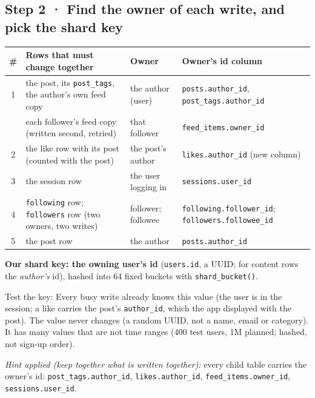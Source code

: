 \subsection*{Step 2 · Find the owner of each write, and pick the shard key}

\begin{center}\small
\begin{tabularx}{\linewidth}{@{}c>{\raggedright}X>{\raggedright}p{3.2cm}>{\raggedright\arraybackslash}p{3.3cm}@{}}
\toprule
\# & Rows that must change together & Owner & Owner's id column \\
\midrule
1 & the post, its \texttt{post\_tags}, the author's own feed copy & the author (user) & \texttt{posts.author\_id}, \texttt{post\_tags.author\_id} \\
  & each follower's feed copy (written second, retried) & that follower & \texttt{feed\_items.owner\_id} \\
2 & the like row with its post (counted with the post) & the post's author & \texttt{likes.author\_id} (new column) \\
3 & the session row & the user logging in & \texttt{sessions.user\_id} \\
4 & \texttt{following} row; \texttt{followers} row (two owners, two writes) & follower; followee & \texttt{following.follower\_id}; \texttt{followers.followee\_id} \\
5 & the post row & the author & \texttt{posts.author\_id} \\
\bottomrule
\end{tabularx}
\end{center}

\noindent\textbf{Our shard key: the owning user's id} (\texttt{users.id}, a UUID; for content rows the
\emph{author's} id), hashed into 64 fixed buckets with \texttt{shard\_bucket()}.

\noindent Test the key:\quad
{} Every busy write already knows this value (the user is in the session; a like carries the post's
\texttt{author\_id}, which the app displayed with the post). \quad
{} The value never changes (a random UUID, not a name, email or category). \quad
{} It has many values that are not time ranges (400 test users, 1M planned; hashed, not sign-up order).

\noindent\emph{Hint applied (keep together what is written together):} every child table carries the owner's id:
\texttt{post\_tags.author\_id}, \texttt{likes.author\_id}, \texttt{feed\_items.owner\_id}, \texttt{sessions.user\_id}.

